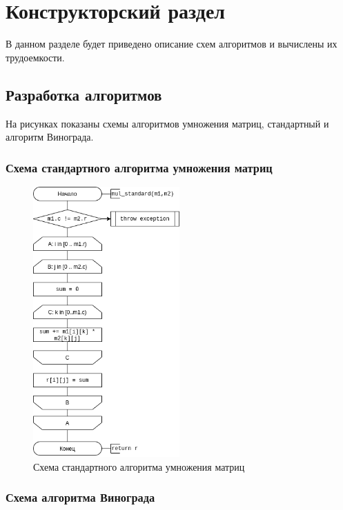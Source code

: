 \chapter{Конструкторский раздел}
\label{cha:design}

В данном разделе будет приведено описание схем алгоритмов
и вычислены их трудоемкости.

\section{Разработка алгоритмов}

На рисунках показаны схемы алгоритмов умножения матриц, стандартный и алгоритм Винограда.


\subsection{Схема стандартного алгоритма умножения матриц}

\begin{figure}[h]
    \centering
    \includegraphics[width=0.5\textwidth]{2/inc/d1.png}
    \caption{Схема стандартного алгоритма умножения матриц}
    \label{fig:2.1}
\end{figure}


\newpage
\subsection{Схема алгоритма Винограда}

